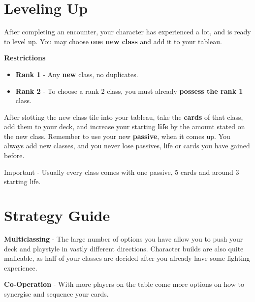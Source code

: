 
\section{Leveling Up}
\label{Section_Leveling}
After completing an encounter, your character has experienced a lot, and is ready to level up. You may choose \textbf{one new class} and add it to your tableau.

\textbf{Restrictions} 
\begin{itemize}
	\item \textbf{Rank 1} -  Any \textbf{new} class, no duplicates.
	\item \textbf{Rank 2} - To choose a rank 2 class, you must already \textbf{possess the rank 1} class.	
\end{itemize}

After slotting the new class tile into your tableau, take the \textbf{cards} of that class, add them to your deck, and increase your starting \textbf{life} by the amount stated on the new class. Remember to use your new \textbf{passive}, when it comes up. You always add new classes, and you never lose passives, life or cards you have gained before.


\begin{tcolorbox}[colframe=red, colback=white]
	Important - Usually every class comes with one passive, 5 cards and around 3 starting life.
\end{tcolorbox} 

\section{Strategy Guide}
\label{Section_Strategy}

\textbf{Multiclassing} - The large number of options you have allow you to push your deck and playstyle in vastly different directions. Character builds are also quite malleable, as half of your classes are decided after you already have some fighting experience.

\textbf{Co-Operation} - With more players on the table come more options on how to synergise and sequence your cards.


\newpage

